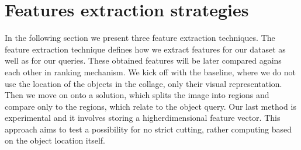 \section{Features extraction strategies}

In the following section we present three feature extraction techniques. The feature extraction technique defines how we extract features for our dataset as well as for our queries. These obtained features will be later compared agains each other in ranking mechanism. We kick off with the baseline, where we do not use the location of the objects in the collage, only their visual representation. Then we move on onto a solution, which splits the image into regions and compare only to the regions, which relate to the object query. Our last method is experimental and it involves storing a higherdimensional feature vector. This approach aims to test a possibility for no strict cutting, rather computing based on the object location itself.

